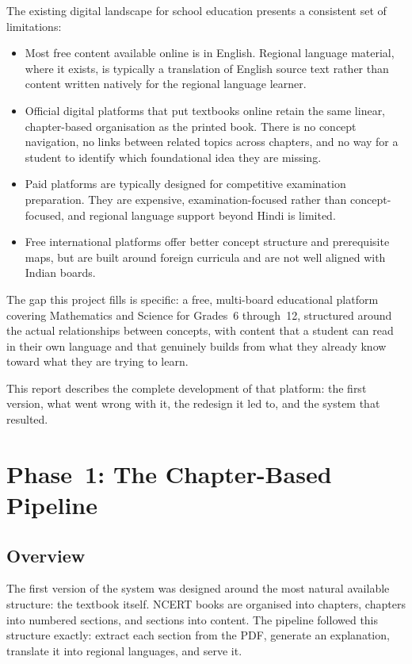 \documentclass[12pt,a4paper]{article}
\begin{document}
The existing digital landscape for school education presents a consistent set of limitations:

\begin{itemize}[leftmargin=2em, itemsep=0.3em]
  \item Most free content available online is in English. Regional language material,
    where it exists, is typically a translation of English source text rather than content
    written natively for the regional language learner.
  \item Official digital platforms that put textbooks online retain the same linear,
    chapter-based organisation as the printed book. There is no concept navigation,
    no links between related topics across chapters, and no way for a student to identify
    which foundational idea they are missing.
  \item Paid platforms are typically designed for competitive examination preparation.
    They are expensive, examination-focused rather than concept-focused,
    and regional language support beyond Hindi is limited.
  \item Free international platforms offer better concept structure and prerequisite maps,
    but are built around foreign curricula and are not well aligned with Indian boards.
\end{itemize}

The gap this project fills is specific: a free, multi-board educational platform covering
Mathematics and Science for Grades~6 through~12, structured around the actual relationships
between concepts, with content that a student can read in their own language and that
genuinely builds from what they already know toward what they are trying to learn.

This report describes the complete development of that platform: the first version,
what went wrong with it, the redesign it led to, and the system that resulted.

\section{Phase~1: The Chapter-Based Pipeline}

\subsection{Overview}

The first version of the system was designed around the most natural available structure:
the textbook itself.
NCERT books are organised into chapters, chapters into numbered sections,
and sections into content.
The pipeline followed this structure exactly: extract each section from the PDF,
generate an explanation, translate it into regional languages, and serve it.
\end{document}
